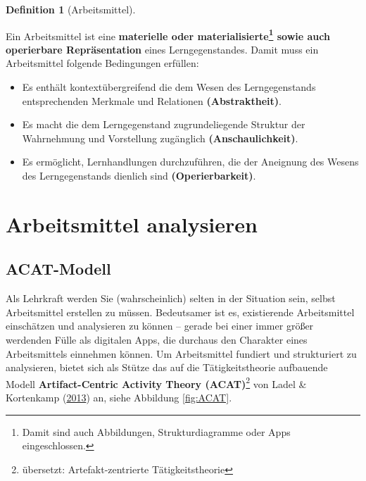 \documentclass[
]{scrbook}
\providecommand{\tightlist}{%
  \setlength{\itemsep}{0pt}\setlength{\parskip}{0pt}}
\theoremstyle{definition}
\newtheorem{definition}{Definition}[chapter]
\theoremstyle{definition}
\theoremstyle{definition}
\theoremstyle{definition}
\theoremstyle{remark}
\begin{document}
\begin{definition}[Arbeitsmittel]
\protect\hypertarget{def:Arbeitsmittel}{}\label{def:Arbeitsmittel}

Ein Arbeitsmittel ist eine \textbf{materielle oder materialisierte\footnote{Damit sind auch Abbildungen, Strukturdiagramme oder Apps eingeschlossen.} sowie auch operierbare Repräsentation} eines Lerngegenstandes. Damit muss ein Arbeitsmittel folgende Bedingungen erfüllen:

\begin{itemize}
\tightlist
\item
  Es enthält kontextübergreifend die dem Wesen des Lerngegenstands entsprechenden Merkmale und Relationen \textbf{(Abstraktheit)}.
\item
  Es macht die dem Lerngegenstand zugrundeliegende Struktur der Wahrnehmung und Vorstellung zugänglich \textbf{(Anschaulichkeit)}.
\item
  Es ermöglicht, Lernhandlungen durchzuführen, die der Aneignung des Wesens des Lerngegenstands dienlich sind \textbf{(Operierbarkeit)}.
\end{itemize}

\end{definition}

\hypertarget{arbeitsmittel-analysieren}{%
\section{Arbeitsmittel analysieren}\label{arbeitsmittel-analysieren}}

\hypertarget{acat-modell}{%
\subsection{ACAT-Modell}\label{acat-modell}}

Als Lehrkraft werden Sie (wahrscheinlich) selten in der Situation sein, selbst Arbeitsmittel erstellen zu müssen. Bedeutsamer ist es, existierende Arbeitsmittel einschätzen und analysieren zu können --
gerade bei einer immer größer werdenden Fülle als digitalen Apps, die durchaus den Charakter eines Arbeitsmittels einnehmen können. Um Arbeitsmittel fundiert und strukturiert zu analysieren, bietet sich als Stütze das auf die Tätigkeitstheorie aufbauende Modell \textbf{Artifact-Centric Activity Theory (ACAT)}\footnote{übersetzt: Artefakt-zentrierte Tätigkeitstheorie} von Ladel \& Kortenkamp (\protect\hyperlink{ref-Ladel2013}{2013}) an, siehe Abbildung \ref{fig:ACAT}.
\end{document}
